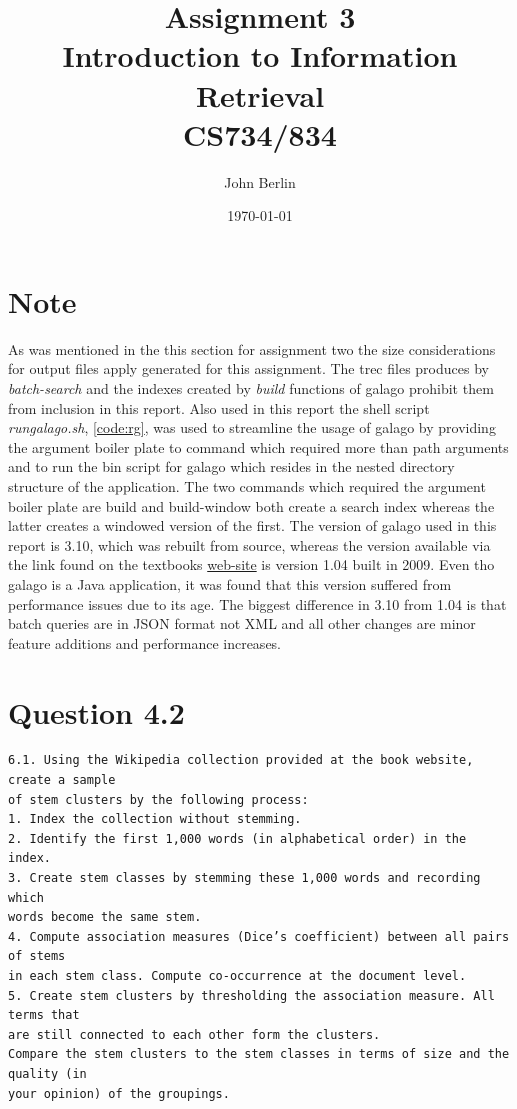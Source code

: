 \documentclass[11pt]{article}
\title{Assignment 3 \\ Introduction to Information Retrieval \\ CS734/834}
\author{John Berlin}
\date{\today}
\begin{document}
\maketitle
\newpage
\section*{Note}
As was mentioned in the this section for assignment two the size considerations for output files apply generated for this assignment.
The trec files produces by \textit{batch-search} and the indexes created by \textit{build} functions of galago prohibit them from inclusion in this report. Also used in this report the shell script \textit{rungalago.sh}, \autoref{code:rg}, was used to streamline the usage of galago by providing the argument boiler plate to command which required more than path arguments and to run the bin script for galago which resides in the nested directory structure of the application.  The two commands which required the argument boiler plate are build and build-window both create a search index whereas the latter creates a windowed version of the first. \newline 
The version of galago used in this report is 3.10, which was rebuilt from source, whereas the version available via the link found on the textbooks \href{http://www.search-engines-book.com/}{web-site} is version 1.04 built in 2009. Even tho galago is a Java application, it was found that this version suffered from performance issues due to its age. The biggest difference in 3.10 from 1.04 is that batch queries are in JSON format not XML and all other changes are minor feature additions and performance increases.
\newpage
\section{Question 4.2} \label{q1}
\begin{verbatim}
6.1. Using the Wikipedia collection provided at the book website, create a sample
of stem clusters by the following process:
1. Index the collection without stemming.
2. Identify the first 1,000 words (in alphabetical order) in the index.
3. Create stem classes by stemming these 1,000 words and recording which
words become the same stem.
4. Compute association measures (Dice’s coefficient) between all pairs of stems
in each stem class. Compute co-occurrence at the document level.
5. Create stem clusters by thresholding the association measure. All terms that
are still connected to each other form the clusters.
Compare the stem clusters to the stem classes in terms of size and the quality (in
your opinion) of the groupings.
\end{verbatim}
\end{document}
